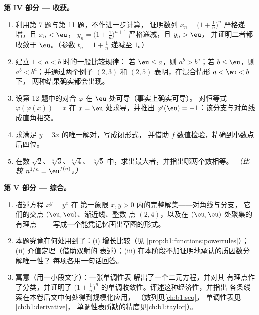 \begin{problem}
\medskip
\noindent\textbf{第 IV 部分 --- 收获。}
\begin{enumerate}[resume]
  \item 利用第 7 题与第 11 题，不作进一步计算，
        证明数列 $x_n = \bigl(1 +
        \frac1n\bigr)^n$ 严格递增，且 $x_n < \eu$，
        $y_n = \bigl(1 + \frac1n\bigr)^{n+1}$ 严格递减，且 $y_n > \eu$，
        并证明二者都收敛于
        $\eu$。（参数 $t_n = 1 + \frac1n$ 递减至
        $1$。）
  \item 建立 $1 < a < b$ 时的一般比较规律：
        若 $\eu \leq a$，则 $a^b > b^a$；若 $b \leq \eu$，则
        $a^b < b^a$；并通过两个例子 $(2, 3)$ 和
        $(2, 5)$ 表明，在混合情形 $a < \eu < b$ 下，
        两种结果确实都会出现。
  \item 设第 12 题中的对合 $\varphi$
        在 $\eu$ 处可导（事实上确实可导）。
        对恒等式 $\varphi(\varphi(x)) = x$ 在 $x = \eu$ 处求导，并推出
        $\varphi'(\eu) = -1$：该分支与对角线
        成直角相交。
  \item 求满足 $y = 3x$ 的唯一解对，写成闭形式，
        并借助 $f$ 数值检验，精确到小数点后四位。
  \item 在数 $\sqrt2$、$\sqrt[3]3$、$\sqrt[4]4$、
        $\sqrt[5]5$ 中，求出最大者，并指出哪两个数相等。
        \emph{（比较 $n^{1/n} =
        \eu^{f(n)}$。）}
\end{enumerate}

\medskip
\noindent\textbf{第 V 部分 --- 综合。}
\begin{enumerate}[resume]
  \item 描述方程 $x^y = y^x$ 在
        第一象限 $x, y > 0$ 内的完整解集——对角线与分支，
        它们的交点 $(\eu, \eu)$、渐近线、整数
        点 $(2, 4)$，以及在 $(\eu, \eu)$ 处聚集的有理点——
        写成一个能凭记忆画出草图的形式。
  \item 本题究竟在何处用到了：(i) 增长比较（见
        \cref{prop:b1:functions:powerrules}）；(ii)
        介值定理（借助双射的
        表述）；(iii) 在本阶段不加证明地承认的质因数分解唯一性？
        每项各用一句话回答。
  \item 寓意（用一小段文字）：一张单调性表
        解出了一个二元方程，并对其
        有理点作了分类，并证明了
        $\bigl(1 + \frac1n\bigr)^n$ 的单调收敛性。评述这种经济性，并指出
        各条线索在本卷后文中何处得到规模化应用，
        （数列见\cref{ch:b1:seq}，
        单调性表见\cref{ch:b1:derivative}，
        单调性表所缺的精度见\cref{ch:b1:taylor}）。
\end{enumerate}
\end{problem}
